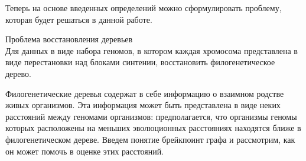 Теперь на основе введенных определений можно сформулировать проблему, которая будет решаться в данной работе.
\begin{prob}{Проблема восстановления деревьев} \\
  Для данных в виде набора геномов, в котором каждая хромосома представлена в виде перестановки над блоками синтении,
  восстановить филогенетическое дерево.
\end{prob}

Филогенетические деревья содержат в себе информацию о взаимном родстве живых организмов.
Эта информация может быть представлена в виде неких расстояний между геномами организмов: предполагается, что организмы геномы которых расположены
на меньших эволюционных расстояниях находятся ближе в филогенетическом дереве.
Введем понятие брейкпоинт графа и рассмотрим, как он может помочь в оценке этих расстояний.


